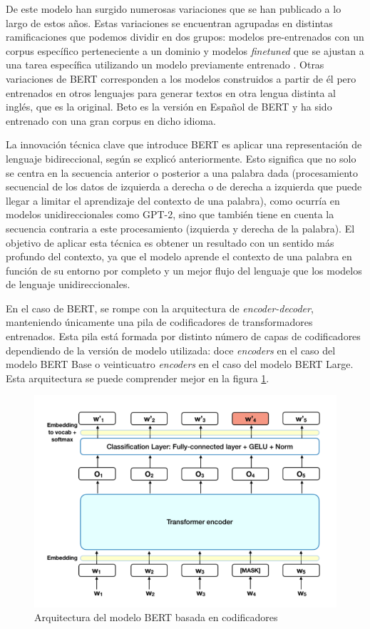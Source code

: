 De este modelo han surgido numerosas variaciones que se han publicado a lo largo de estos años. Estas variaciones se encuentran agrupadas en distintas ramificaciones que podemos dividir en dos grupos: modelos pre-entrenados con un corpus específico perteneciente a un dominio y modelos \textit{finetuned} que se ajustan a una tarea específica utilizando un modelo previamente entrenado \citep{rajasekharan_2019}.
Otras variaciones de BERT corresponden a los modelos construidos a partir de él pero entrenados en otros lenguajes para generar textos en otra lengua distinta al inglés, que es la original. Beto es la versión en Español de BERT \citep{CaneteCFP2020} y ha sido entrenado con una gran corpus en dicho idioma.


La innovación técnica clave que introduce BERT es aplicar una representación de lenguaje bidireccional, según se explicó anteriormente. Esto significa que no solo se centra en la secuencia anterior o posterior a una palabra dada (procesamiento secuencial de los datos de izquierda a derecha o de derecha a izquierda que puede llegar a limitar el aprendizaje del contexto de una palabra), como ocurría en modelos unidireccionales como GPT-2, sino que también tiene en cuenta la secuencia contraria a este procesamiento (izquierda y derecha de la palabra). El objetivo de aplicar esta técnica es obtener un resultado con un sentido más profundo del contexto, ya que el modelo aprende el contexto de una palabra en función de su entorno por completo y un mejor flujo del lenguaje que los modelos de lenguaje unidireccionales.


En el caso de BERT, se rompe con la arquitectura de \textit{encoder-decoder}, manteniendo únicamente una pila de codificadores de transformadores entrenados. Esta pila está formada por distinto número de capas de codificadores dependiendo de la versión de modelo utilizada: doce \textit{encoders} en el caso del modelo BERT Base o veinticuatro \textit{encoders} en el caso del modelo BERT Large. Esta arquitectura se puede comprender mejor en la figura \ref{fig:bert-MLM}.


\begin{figure}[!h]
	\centering
	\includegraphics[width=1.0\textwidth]{Imagenes/Bitmap/02EstadoDeLaCuestion/bert-MLM}%
	\caption{Arquitectura del modelo BERT basada en codificadores%
		\label{fig:bert-MLM}}
\end{figure}


